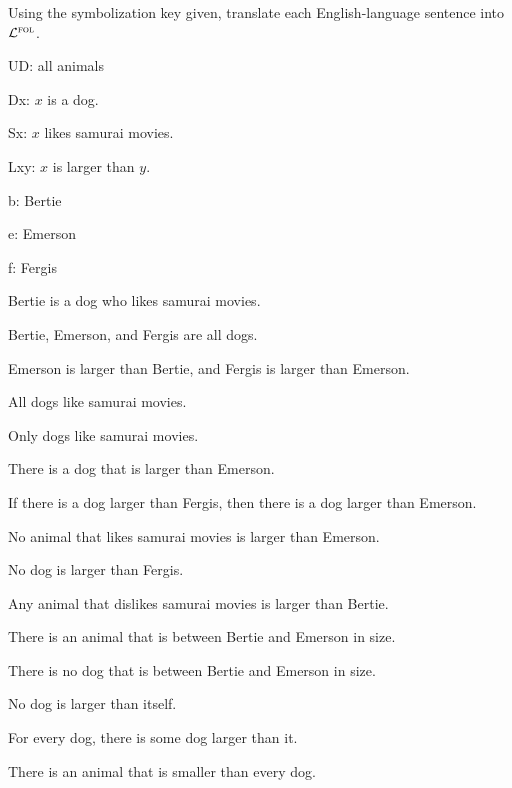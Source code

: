 \solutions
\problempart Using the symbolization key given, translate each English-language sentence into $\FOL$.
\label{pr.$\FOL$dogtrans}
\begin{ekey}
\item[UD:] all animals
\item[Dx:] $x$ is a dog.
\item[Sx:] $x$ likes samurai movies.
\item[Lxy:] $x$ is larger than $y$.
\item[b:] Bertie
\item[e:] Emerson
\item[f:] Fergis
\end{ekey}
\begin{earg}
\item Bertie is a dog who likes samurai movies.
\item Bertie, Emerson, and Fergis are all dogs.
\item Emerson is larger than Bertie, and Fergis is larger than Emerson.
\item All dogs like samurai movies.
\item Only dogs like samurai movies.
\item There is a dog that is larger than Emerson.
\item If there is a dog larger than Fergis, then there is a dog larger than Emerson.
\item No animal that likes samurai movies is larger than Emerson.
\item No dog is larger than Fergis.
\item Any animal that dislikes samurai movies is larger than Bertie.
\item There is an animal that is between Bertie and Emerson in size.
\item There is no dog that is between Bertie and Emerson in size.
\item No dog is larger than itself.
\item For every dog, there is some dog larger than it.
\item There is an animal that is smaller than every dog.
\end{earg}


